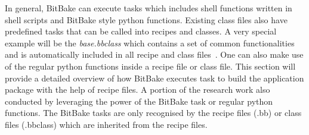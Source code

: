 In general, BitBake can execute tasks which includes shell functions written in shell scripts and BitBake style python functions. Existing class files also have predefined tasks that can be called into recipes and classes. A very special example will be the \emph{base.bbclass} which contains a set of common functionalities and is automatically included in all recipe and class files~\parencite{team2006openembedded}. One can also make use of the regular python functions inside a recipe file or class file. This section will provide a detailed overview of how BitBake executes task to build the application package with the help of recipe files. A portion of the research work also conducted by leveraging the power of the BitBake task or regular python functions. The BitBake tasks are only recognised by the recipe files (.bb) or class files (.bbclass) which are inherited from the recipe files. 

